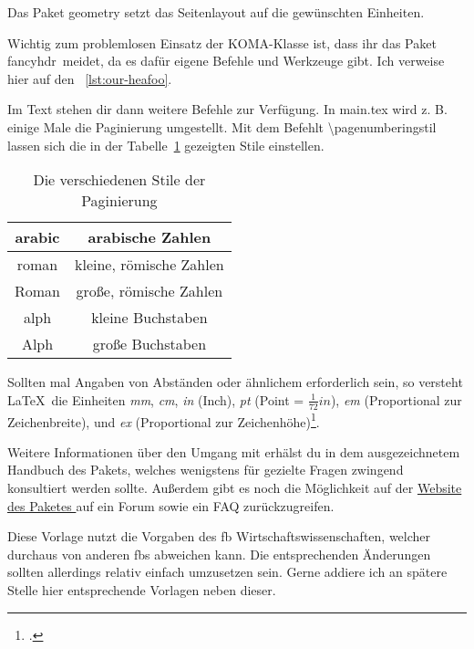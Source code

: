 Das Paket geometry setzt das Seitenlayout auf die gewünschten Einheiten.

Wichtig zum problemlosen Einsatz der KOMA-Klasse ist, dass ihr das Paket \glqq fancyhdr\grqq\ meidet, da es dafür eigene Befehle und Werkzeuge gibt. Ich verweise hier auf den ~\ref{lst:our-heafoo}.



Im Text stehen dir dann weitere Befehle zur Verfügung. In main.tex wird z. B. einige Male die Paginierung umgestellt. Mit dem Befehlt \textbackslash pagenumberingstil lassen sich die in der Tabelle~\ref{tab:pgnumb} gezeigten Stile einstellen.

\begin{table}[htb]
  \centering
  \begin{tabular}{|c|c|}
    \hline
    arabic & arabische Zahlen \\ \hline
    roman & kleine, römische Zahlen \\ \hline
    Roman & große, römische Zahlen \\ \hline
    alph & kleine Buchstaben \\ \hline
    Alph & große Buchstaben \\ \hline
  \end{tabular}
  \caption{Die verschiedenen Stile der Paginierung}
  \label{tab:pgnumb}
\end{table}

Sollten mal Angaben von Abständen oder ähnlichem erforderlich sein, so versteht \LaTeX{}\ die Einheiten \emph{mm}, \emph{cm}, \emph{in} (Inch), \emph{pt} (Point = $\frac{1}{72} in$), \emph{em} (Proportional zur Zeichenbreite), und \emph{ex} (Proportional zur Zeichenhöhe)\footcite[Vgl. ][S. 5]{riedel_latex_2011}.

Weitere Informationen über den Umgang mit  erhälst du in dem ausgezeichnetem Handbuch des Pakets, welches wenigstens für gezielte Fragen zwingend konsultiert werden sollte. Außerdem gibt es noch die Möglichkeit auf der \href{https://komascript.de/}{Website des Paketes \protect{}} auf ein Forum sowie ein FAQ zurückzugreifen.

Diese Vorlage nutzt die Vorgaben des \gls{fb} Wirtschaftswissenschaften, welcher durchaus von anderen \glspl{fb} abweichen kann. Die entsprechenden Änderungen sollten allerdings relativ einfach umzusetzen sein. Gerne addiere ich an spätere Stelle hier entsprechende Vorlagen neben dieser.%
